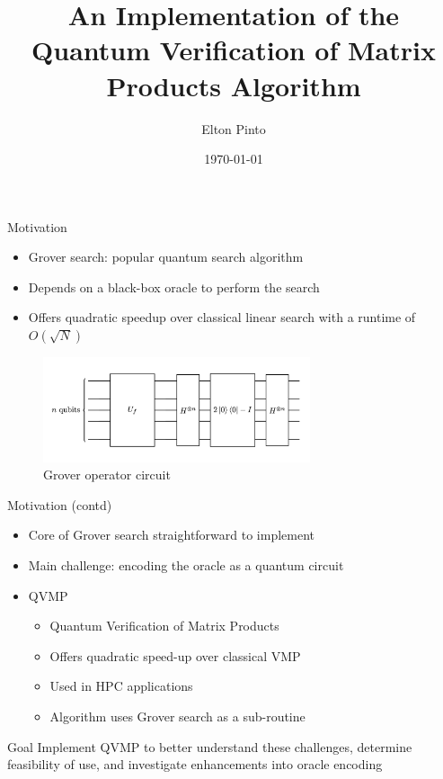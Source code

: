 \documentclass[10pt]{beamer}
\title{An Implementation of the Quantum Verification of Matrix Products Algorithm}
\author{Elton Pinto}
\date{\today}
\begin{document}
\begin{frame}[plain]
\titlepage
\end{frame}


\begin{frame}{Motivation}
  \begin{itemize}
    \item Grover search: popular quantum search algorithm
    \item Depends on a black-box oracle to perform the search
    \item Offers quadratic speedup over classical linear search with a
      runtime of $O(\sqrt{N})$
  \end{itemize}
  \begin{figure}
    \centering
    \includegraphics[width=0.7\textwidth]{assets/grover_operator.png}
    \caption{Grover operator circuit}
    \label{fig:grover_operator_circuit}
  \end{figure}
\end{frame}


\begin{frame}{Motivation (contd)}
  \begin{itemize}
    \item Core of Grover search straightforward to implement
    \item {
      Main challenge: encoding the oracle as a quantum circuit
    }
    \item {
      QVMP
      \begin{itemize}
        \item Quantum Verification of Matrix Products
        \item Offers quadratic speed-up over classical VMP
        \item Used in HPC applications
        \item Algorithm uses Grover search as a sub-routine
      \end{itemize}
    }
  \end{itemize}

  \begin{alertblock}{Goal}
    Implement QVMP to better understand these challenges, determine feasibility
    of use, and investigate enhancements into oracle encoding
  \end{alertblock}
\end{frame}
\end{document}
